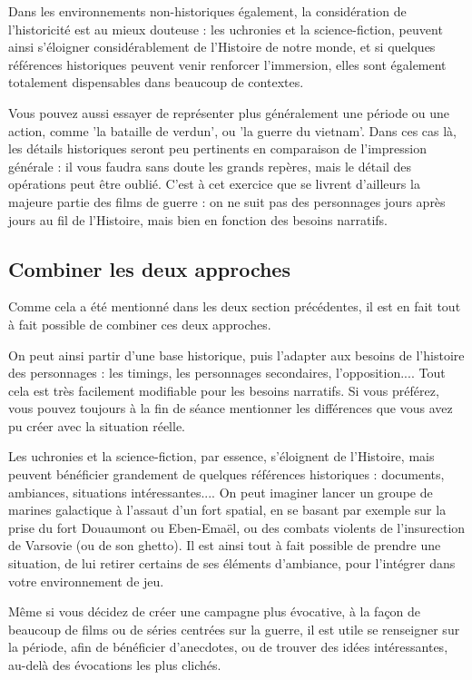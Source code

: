 \documentclass{report}
\begin{document}
\begin{multicols}{2}
Dans les environnements non-historiques également, la considération de l'historicité est au mieux douteuse : les uchronies et la science-fiction, peuvent ainsi s'éloigner considérablement de l'Histoire de notre monde, et si quelques références historiques peuvent venir renforcer l'immersion, elles sont également totalement dispensables dans beaucoup de contextes.

Vous pouvez aussi essayer de représenter plus généralement une période ou une action, comme 'la bataille de verdun', ou 'la guerre du vietnam'. Dans ces cas là, les détails historiques seront peu pertinents en comparaison de l'impression générale : il vous faudra sans doute les grands repères, mais le détail des opérations peut être oublié. C'est à cet exercice que se livrent d'ailleurs la majeure partie des films de guerre : on ne suit pas des personnages jours après jours au fil de l'Histoire, mais bien en fonction des besoins narratifs.

\subsection{Combiner les deux approches}
Comme cela a été mentionné dans les deux section précédentes, il est en fait tout à fait possible de combiner ces deux approches. 

On peut ainsi partir d'une base historique, puis l'adapter aux besoins de l'histoire des personnages : les timings, les personnages secondaires, l'opposition.... Tout cela est très facilement modifiable pour les besoins narratifs. Si vous préférez, vous pouvez toujours à la fin de séance mentionner les différences que vous avez pu créer avec la situation réelle.

Les uchronies et la science-fiction, par essence, s'éloignent de l'Histoire, mais peuvent bénéficier grandement de quelques références historiques : documents, ambiances, situations intéressantes.... On peut imaginer lancer un groupe de marines galactique à l'assaut d'un fort spatial, en se basant par exemple sur la prise du fort Douaumont ou Eben-Emaël, ou des combats violents de l'insurection de Varsovie (ou de son ghetto). Il est ainsi tout à fait possible de prendre une situation, de lui retirer certains de ses éléments d'ambiance, pour l'intégrer dans votre environnement de jeu.

Même si vous décidez de créer une campagne plus évocative, à la façon de beaucoup de films ou de séries centrées sur la guerre, il est utile se renseigner sur la période, afin de bénéficier d'anecdotes, ou de trouver des idées intéressantes, au-delà des évocations les plus clichés.

\end{multicols}
\end{document}
